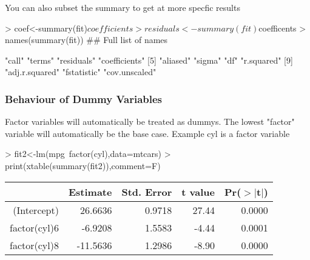 \documentclass{article}
\begin{document}
\newpage

You can also subset the summary to get at more specfic results

\begin{Schunk}
\begin{Sinput}
> coef<-summary(fit)$coefficients
> residuals<-summary(fit)$coefficents
> names(summary(fit))                 ## Full list of names
\end{Sinput}
\begin{Soutput}
 [1] "call"          "terms"         "residuals"     "coefficients" 
 [5] "aliased"       "sigma"         "df"            "r.squared"    
 [9] "adj.r.squared" "fstatistic"    "cov.unscaled" 
\end{Soutput}
\end{Schunk}


\subsubsection*{Behaviour of Dummy Variables}
Factor variables will automatically be treated as dummys. The lowest "factor" variable
will automatically be the base case. Example cyl is a factor variable

\begin{Schunk}
\begin{Sinput}
> fit2<-lm(mpg~factor(cyl),data=mtcars)
> print(xtable(summary(fit2)),comment=F)
\end{Sinput}
\begin{table}[ht]
\centering
\begin{tabular}{rrrrr}
  \hline
 & Estimate & Std. Error & t value & Pr($>$$|$t$|$) \\ 
  \hline
(Intercept) & 26.6636 & 0.9718 & 27.44 & 0.0000 \\ 
  factor(cyl)6 & -6.9208 & 1.5583 & -4.44 & 0.0001 \\ 
  factor(cyl)8 & -11.5636 & 1.2986 & -8.90 & 0.0000 \\ 
   \hline
\end{tabular}
\end{table}\end{Schunk}
\end{document}
